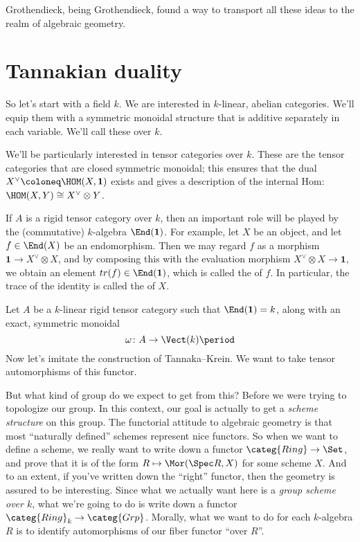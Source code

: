 \documentclass[leqno]{article}
\begin{document}
Grothendieck, being Grothendieck, found a way
to transport all these ideas to the realm of algebraic geometry.

\section{Tannakian duality}%
\label{tannakian}

So let's start with a field \(k\).
We are interested in \(k\)-linear, abelian categories.
We'll equip them with a symmetric monoidal structure
that is additive separately in each variable.
We'll call these  over \(k\).

We'll be particularly interested in  tensor categories
over \(k\).
These are the tensor categories that are closed symmetric monoidal;
this ensures that the dual \(X^{\vee} \coloneq \HOM(X,\mathbf{1})\)
exists and gives a description of the internal Hom:
\(\HOM(X,Y) \cong X^{\vee}\otimes Y\).

If \(A\) is a rigid tensor category over \(k\), then
an important role will be played by the (commutative) \(k\)-algebra
\(\End(\mathbf{1})\).
For example, let \(X\) be an object, and
let \(f \in \End(X)\) be an endomorphism.
Then we may regard \(f\) as a morphism
\(\mathbf{1} \to X^{\vee} \otimes X\),
and by composing this with the evaluation morphism
\(X^{\vee} \otimes X \to  \mathbf{1}\),
we obtain an element \(\mathop{tr}(f) \in \End(\mathbf{1})\),
which is called the  of \(f\).
In particular, the trace of the identity is called
the  of \(X\).

Let \(A\) be a \(k\)-linear rigid tensor category
such that \(\End(\mathbf{1}) = k\), along with
an exact, symmetric monoidal 
\begin{equation*}
    \omega \colon A \to \Vect(k) \period
\end{equation*}
Now let's imitate the construction of Tannaka--Krein.
We want to take tensor automorphisms of this functor.

But what kind of group do we expect to get from this?
Before we were trying to topologize our group.
In this context, our goal is actually
to get a \emph{scheme structure} on this group.
The functorial attitude to algebraic geometry is that
most \enquote{naturally defined} schemes represent nice functors.
So when we want to define a scheme, we really want
to write down a functor \(\categ{Ring} \to \Set\),
and prove that it is of the form \(R \mapsto \Mor(\Spec R, X)\)
for some scheme \(X\).
And to an extent, if you've written down the \enquote{right} functor,
then the geometry is assured to be interesting.
Since what we actually want here is a \emph{group scheme over \(k\)},
what we're going to do is write down a functor
\(\categ{Ring}_k \to \categ{Grp}\).
Morally, what we want to do for each \(k\)-algebra \(R\) is
to identify automorphisms of our fiber functor \enquote{over \(R\)}.
\end{document}

